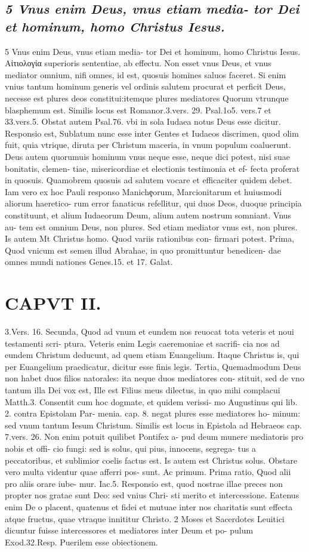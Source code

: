\documentclass{article}
\begin{document}
\begin{pages}
\subsection*{\textit{5 Vnus enim Deus, vnus etiam media- tor Dei et hominum, homo Christus Iesus.}}5 Vnus enim Deus, vnus etiam media- tor Dei et hominum, homo Christus Iesus. Αἰτιολογία superioris sententiae, ab effectu. Non esset vnus Deus, et vnus mediator omnium, nifi omnes, id est, quosuis homines saluos faceret. Si enim vnius tantum hominum generis vel ordinis salutem procurat et perficit Deus, necesse est plures deos constitui:itemque plures mediatores Quorum vtrunque blasphemum est. Similis locus est Romanor.3.vers. 29. Psal.1o5. vers.7 et 33.vers.5. Obstat autem Psal.76. vbi in sola Iudaea notus Deus esse dicitur. Responsio est, Sublatum nunc esse inter Gentes et Iudaeos discrimen, quod olim fuit, quia vtrique, diruta per Christum maceria, in vnum populum coaluerunt. Deus autem quorumuis hominum vnus neque esse, neque dici potest, nisi suae bonitatis, clemen- tiae, misericordiae et electionis testimonia et ef- fecta proferat in quosuis. Quamobrem quosuis ad salutem vocare et efficaciter quidem debet. Iam vero ex hoc Pauli responso Manichȩorum, Marcionitarum et huiusmodi aliorum haeretico- rum error fanaticus refellitur, qui duos Deos, duoque principia constituunt, et alium Iudaeorum Deum, alium autem nostrum somniant. Vnus au- tem est omnium Deus, non plures. Sed etiam mediator vnus est, non plures. Is autem Mt Christus homo. Quod variis rationibus con- firmari potest. Prima, Quod vnicum est semen illud Abrahae, in quo promittuntur benedicen- dae omnes mundi nationes Genes.15. et 17. Galat.  \pend
\section*{CAPVT  II. }
\marginpar{[ p.57 ]}\pstart 3.Vers. 16. Secunda, Quod ad vnum et eundem nos reuocat tota veteris et noui testamenti scri- ptura. Veteris enim Legis caeremoniae et sacrifi- cia nos ad eundem Christum deducunt, ad quem etiam Euangelium. Itaque Christus is, qui per Euangelium praedicatur, dicitur esse finis legis. Tertia, Quemadmodum Deus non habet duos filios natorales: ita neque duos mediatores con- stituit, sed de vno tantum illa Dei vox est, Ille est Filius meus dilectus, in quo mihi complacui Matth.3. Consentit cum hoc dogmate, et quidem verissi- mo Augustinus qui lib. 2. contra Epistolam Par- menia. cap. 8. negat plures esse mediatores ho- minum: sed vnum tantum Iesum Christum. Similis est locus in Epistola ad Hebraeos cap. 7.vers. 26. Non enim potuit quilibet Pontifex a- pud deum munere mediatoris pro nobis et offi- cio fungi: sed is solus, qui pius, innocens, segrega- tus a peccatoribus, et sublimior coelis factus est. Is autem est Christus solus. Obstare vero multa videntur quae afferri pos- sunt. Ac primum. Prima ratio, Quod alii pro aliis orare iube- mur. Iac.5. Responsio est, quod nostrae illae preces non propter nos gratae sunt Deo: sed vnius Chri- sti merito et intercessione. Eatenus enim De o placent, quatenus et fidei et mutuae inter nos charitatis sunt effecta atque fructus, quae vtraque innititur Christo. 2 Moses et Sacerdotes Leuitici dicuntur fuisse intercessores et mediatores inter Deum et po- pulum Exod.32.Resp. Puerilem esse obiectionem.  \pend

\end{pages}
\end{document}
